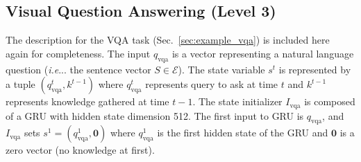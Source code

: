 \documentclass{article}
\makeatletter
\def\E{\mathcal{E}}
\DeclareRobustCommand\onedot{\futurelet\@let@token\@onedot}
\def\@onedot{\ifx\@let@token.\else.\null\fi\xspace}
\def\ie{\emph{i.e}\onedot} \def\Ie{\emph{I.e}\onedot}
\makeatother
\begin{document}
\subsection{Visual Question Answering (Level 3)}
The description for the VQA task (Sec.~\ref{sec:example_vqa}) is included here again for completeness.
The input $q_\mathrm{vqa}$ is a vector representing a natural language question (\ie. the sentence vector $S \in \E$).
The state variable $s^t$ is represented by a tuple $(q_{\mathrm{vqa}}^t, k^{t-1})$ where $q_{\mathrm{vqa}}^t$ represents query to ask at time $t$ and $k^{t-1}$ represents knowledge gathered at time $t-1$.
The state initializer $I_\mathrm{vqa}$ is composed of a GRU with hidden state dimension 512.
The first input to GRU is $q_\mathrm{vqa}$, and $I_\mathrm{vqa}$ sets $s^1 = (q_\mathrm{vqa}^1, \textbf{0})$ where $q_\mathrm{vqa}^1$ is the first hidden state of the GRU and $\textbf{0}$ is a zero vector (no knowledge at first).
\end{document}
